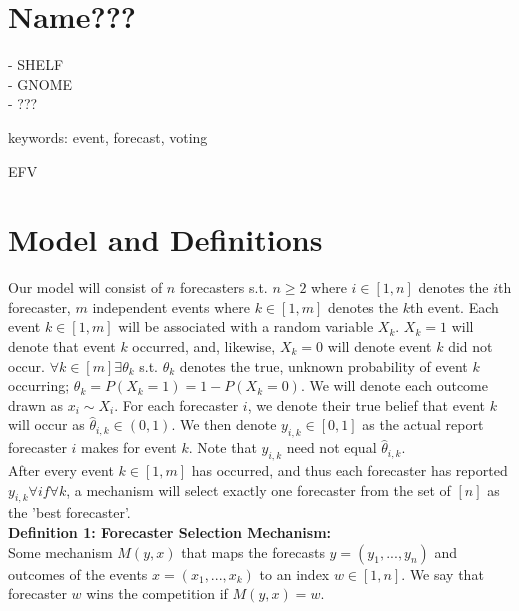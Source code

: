 \documentclass[letterpaper,12pt]{article}
\renewenvironment{abstract}
 {
  \begin{center}
  \vspace{3em} \bfseries \abstractname\vspace{0em}\vspace{0pt}
  \end{center}
  \list{}{%
    \setlength{\leftmargin}{20mm}%
    \setlength{\rightmargin}{\leftmargin}%
  }%
  \item\relax}
 {\endlist}
\newcommand{\1}{\mathbbm{1}}
\begin{document}


 
\section{Name???}
- SHELF\\
- GNOME\\
- ???


keywords: event, forecast, voting

EFV

\section{Model and Definitions}
Our model will consist of $n$ forecasters s.t. $n \ge 2$ where $i \in [1,n]$ denotes the $i$th forecaster, $m$ independent events where $k \in [1,m]$ denotes the $k$th event. Each event $k \in [1,m]$ will be associated with a random variable $X_k$. $X_k = 1$ will denote that event $k$ occurred, and, likewise, $X_k = 0$ will denote event $k$ did not occur. $\forall k \in [m] \exists \theta_k$ s.t. $\theta_k$ denotes the true, unknown probability of event $k$ occurring;  $\theta_k = P(X_k = 1) = 1 - P(X_k = 0)$. We will denote each outcome drawn as $x_i \sim X_i$. For each forecaster $i$, we denote their true belief that event $k$ will occur as $\hat{\theta}_{i,k} \in (0,1)$. We then denote $y_{i,k} \in [0,1]$ as the actual report forecaster $i$ makes for event $k$. Note that $y_{i,k}$ need not equal $\hat{\theta}_{i,k}$. \\

After every event $k \in [1,m]$ has occurred, and thus each forecaster has reported $y_{i,k} \forall i f\forall k$, a mechanism will select exactly one forecaster from the set of $[n]$ as the 'best forecaster'.\\

\textbf{Definition 1: Forecaster Selection Mechanism:}\\
Some mechanism $M(y, x)$ that maps the forecasts $y = (y_1, ..., y_n)$ and outcomes of the events $x = (x_1, ..., x_k)$ to an index $w \in [1, n]$. We say that forecaster $w$ wins the competition if $M(y, x) = w$.\\
\end{document}
